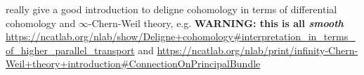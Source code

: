 
\cite{Nie:2009ww,BM1996,Green:1980wpa}

really give a good introduction to deligne cohomology in terms of differential cohomology and $\infty$-Chern-Weil theory, e.g. {\color{red}\textbf{WARNING: this is all \emph{smooth}}} \url{https://ncatlab.org/nlab/show/Deligne+cohomology#interpretation_in_terms_of_higher_parallel_transport} and \url{https://ncatlab.org/nlab/print/infinity-Chern-Weil+theory+introduction#ConnectionOnPrincipalBundle}
